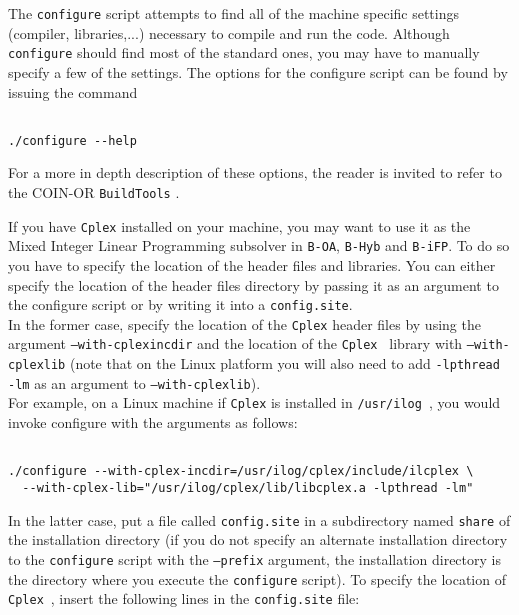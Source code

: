 The {\tt configure} script attempts to find all of the machine specific settings (compiler, libraries,...)
necessary to compile and run the code. Although {\tt configure} should find most of the standard
ones, you may have to manually specify a few of the settings.
The options for the configure script can be found by issuing the command

\begin{colorverb}
\begin{verbatim}

./configure --help

\end{verbatim}
\end{colorverb}

For a more in depth description of these options,
the reader is invited to refer to the COIN-OR {\tt BuildTools} .

If you have {\tt Cplex} installed on your machine, you may want to use it
as the Mixed Integer Linear Programming subsolver in {\tt B-OA}, {\tt B-Hyb}
and {\tt B-iFP}.
To do so you have to specify the location of the header files and libraries.
You can either specify the location of the header files directory by passing it as an
argument to the configure script or by writing it into a {\tt config.site}.\\

In the former case, specify the location of the {\tt Cplex} header files by using the
argument {\tt --with-cplexincdir} and the location of the
{\tt Cplex } library with {\tt --with-cplexlib} (note that on the Linux platform you will also
need to add {\tt -lpthread -lm} as an argument to {\tt --with-cplexlib}).\\

For example, on a Linux machine if {\tt Cplex} is installed in {\tt /usr/ilog}~, you would
invoke configure with the arguments as follows:

\begin{colorverb}
\begin{verbatim}

./configure --with-cplex-incdir=/usr/ilog/cplex/include/ilcplex \
  --with-cplex-lib="/usr/ilog/cplex/lib/libcplex.a -lpthread -lm"
 \end{verbatim}
 \end{colorverb}
 
In the latter case, put a file called {\tt config.site} in a subdirectory named
{\tt share} of the installation directory (if you do not specify an alternate
installation directory to the {\tt configure} script with the {\tt --prefix}
argument, the installation directory is the directory where you execute the
{\tt configure} script). To specify the location of {\tt Cplex}~, insert the
following lines in the {\tt config.site} file:

